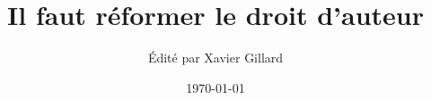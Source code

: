 \documentclass[11pt,liststotoc,bibtotoc]{scrbook}
\title{Il faut réformer le droit d'auteur}
\author{Édité par Xavier Gillard}
\date{\today}
\theoremstyle{break}
\begin{document}
\renewcommand{\labelitemi}{$\bullet$}

\maketitle




\tableofcontents











\appendix


\end{document}
